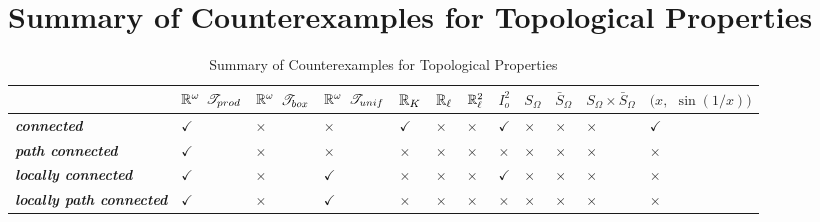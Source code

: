 \documentclass[11pt]{article}
\begin{document}
\section{Summary of Counterexamples for Topological Properties}
\begin{table}[h!]
\setlength{\abovedisplayskip}{0pt}
\setlength{\belowdisplayskip}{-10pt}
\setlength{\abovedisplayshortskip}{0pt}
\setlength{\belowdisplayshortskip}{0pt}
\footnotesize
\centering
\caption{Summary of Counterexamples for Topological Properties}
\label{tab: counterexample}
\renewcommand\tabularxcolumn[1]{m{#1}}
\small
\begin{tabularx}{1\textwidth} { 
  | >{\raggedright\arraybackslash} m{2cm}
  | >{\centering\arraybackslash}X
  | >{\centering\arraybackslash}X
  | >{\centering\arraybackslash}X
  | >{\centering\arraybackslash}X
  | >{\centering\arraybackslash}X
  | >{\centering\arraybackslash}X
  | >{\centering\arraybackslash}X
  | >{\centering\arraybackslash}X
  | >{\centering\arraybackslash}X
  | >{\centering\arraybackslash}m{1.5cm}
  | >{\centering\arraybackslash}m{1.5cm}  | }
 \hline
  &  ${\mathbb R}^{\omega}$  ${\mathscr T}_{prod}$ &  ${\mathbb R}^{\omega}$  ${\mathscr T}_{box}$ &  ${\mathbb R}^{\omega}$  $ {\mathscr T}_{unif}$ &  ${\mathbb R}_{K}$  &  ${\mathbb R}_{\ell}$ & ${\mathbb R}_{\ell}^2$  & $I_o^2$  & $S_{\Omega}$ & $\bar{S}_{\Omega}$ & $S_{\Omega} \times \bar{S}_{\Omega}$ & $(x,$ $\sin(1/x))$\\
  \hline \vspace{5pt}
\emph{\textbf{connected}}  \vspace{2pt} & $\checkmark$ & $\times$ & $\times$  & $\checkmark$ & $\times$ & $\times$ & $\checkmark$ &  $\times$ & $\times$ &  $\times$ &  $\checkmark$  \\
\hline \vspace{5pt}
\emph{\textbf{path connected}}  \vspace{2pt} & $\checkmark$ & $\times$ &  $\times$ & $\times$ & $\times$ & $\times$ & $\times$ & $\times$ &$\times$  & $\times$ &  $\times$ \\
\hline \vspace{5pt}
\emph{\textbf{locally connected}}  \vspace{2pt} &  $\checkmark$ &  $\times$  &  $\checkmark$ & $\times$ & $\times$ &  $\times$ & $\checkmark$ & $\times$ &$\times$  &  $\times$ &  $\times$ \\
\hline \vspace{5pt}
\emph{\textbf{locally path connected}}  \vspace{2pt} &  $\checkmark$ &  $\times$  &  $\checkmark$ &$\times$ & $\times$ & $\times$ & $\times$ & $\times$ & $\times$ &$\times$ &  $\times$ \\

\end{tabularx}
\end{table}
\end{document}
